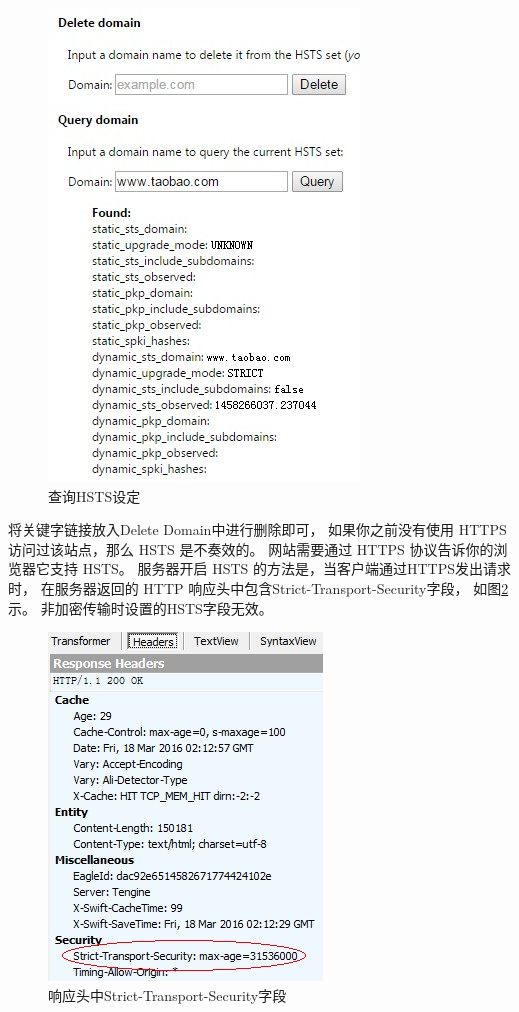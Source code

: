 \documentclass{book}
\begin{document}
\begin{figure}[htbp]
	\centering
	\includegraphics[scale=0.7]{DeleteChromeHSTSSetting.jpg}
	\caption{查询HSTS设定}
	\label{fig:DeleteChromeHSTSSetting}
\end{figure}

将关键字链接放入Delete Domain中进行删除即可，
如果你之前没有使用 HTTPS 访问过该站点，那么 HSTS 是不奏效的。
网站需要通过 HTTPS 协议告诉你的浏览器它支持 HSTS。
服务器开启 HSTS 的方法是，当客户端通过HTTPS发出请求时，
在服务器返回的 HTTP 响应头中包含Strict-Transport-Security字段，
如图\ref{fig:HSTSResponseHeaderSecurity}示。
非加密传输时设置的HSTS字段无效。

\begin{figure}[htbp]
	\centering
	\includegraphics[scale=0.7]{HSTSResponseHeaderSecurity.jpg}
	\caption{响应头中Strict-Transport-Security字段}
	\label{fig:HSTSResponseHeaderSecurity}
\end{figure}
\end{document}
